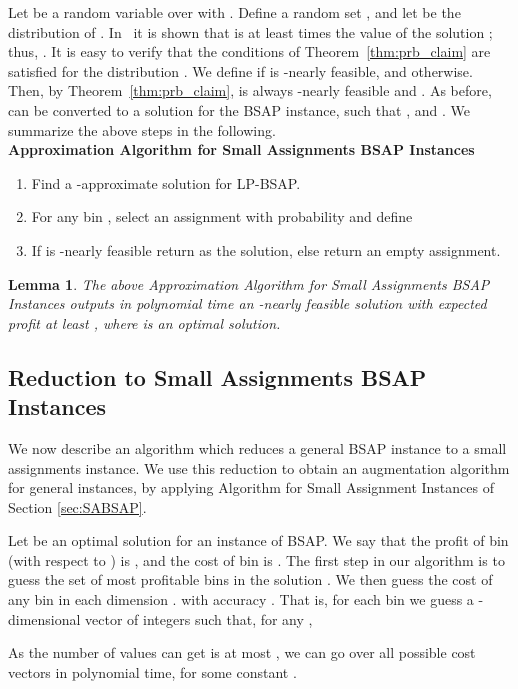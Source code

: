 \documentclass[11pt]{article}
\newtheorem{lemma}[theorem]{Lemma}
\begin{document}
{Let  be a random variable over  with . Define a random set ,
and let  be the distribution of . In~\cite{fgms06} it is shown that  is at least  times the value of the
solution ; thus, .
It is easy to verify that the conditions of  Theorem~\ref{thm:prb_claim} are satisfied for the distribution .
We define  if  is -nearly feasible, and  otherwise. Then, by Theorem~\ref{thm:prb_claim},  is always
-nearly feasible and . As before,  can be converted to a solution  for the BSAP
instance, such that , and . We summarize the above steps in the following.
\\
\noindent
{\bf Approximation Algorithm for Small Assignments BSAP Instances}
\begin{enumerate}
\item Find a -approximate solution  for LP-BSAP.
\item For any bin ,  select an assignment  with probability 
and define 
\item If  is -nearly feasible return  as the solution,
else return an empty assignment.
\end{enumerate}
\begin{lemma}
\label{thm:SABSAP} The above Approximation Algorithm for Small Assignments
 BSAP Instances outputs in polynomial time an -nearly feasible
solution with  expected profit at least , where  is an optimal solution.
\end{lemma}

\subsection{Reduction to Small Assignments BSAP Instances}

We now describe an algorithm which reduces a general BSAP instance
to a small assignments instance. We use this reduction to obtain an
augmentation algorithm for general instances, by applying Algorithm for Small Assignment Instances of
Section \ref{sec:SABSAP}.

Let  be an optimal solution for an instance of BSAP. We say that the profit of bin  (with respect to ) is
, and the cost of bin  is . The first step in our algorithm is to guess the set  of
 most profitable bins in the solution .
 We then guess the cost of any bin  in each dimension .
with
accuracy .
That is,
for each bin  we guess a -dimensional vector of integers
 such that, for any ,

As the number of values  can get is at most  , we can
go over all possible cost vectors in polynomial time, for some constant .

}
\end{document}
